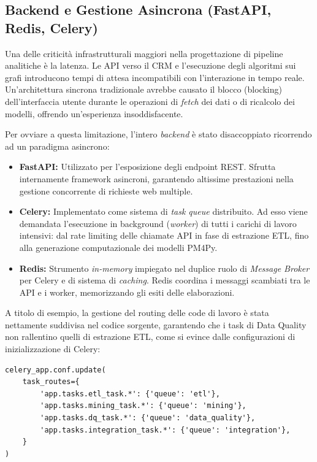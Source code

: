 \documentclass[12pt, a4paper]{report}
\begin{document}
\subsection{Backend e Gestione Asincrona (FastAPI, Redis, Celery)}
Una delle criticità infrastrutturali maggiori nella progettazione di pipeline analitiche è la latenza. Le API verso il CRM e l'esecuzione degli algoritmi sui grafi introducono tempi di attesa incompatibili con l'interazione in tempo reale. Un'architettura sincrona tradizionale avrebbe causato il blocco (blocking) dell'interfaccia utente durante le operazioni di \textit{fetch} dei dati o di ricalcolo dei modelli, offrendo un'esperienza insoddisfacente.

Per ovviare a questa limitazione, l'intero \textit{backend} è stato disaccoppiato ricorrendo ad un paradigma asincrono:
\begin{itemize}
    \item \textbf{FastAPI:} Utilizzato per l'esposizione degli endpoint REST. Sfrutta internamente framework asincroni, garantendo altissime prestazioni nella gestione concorrente di richieste web multiple.
    \item \textbf{Celery:} Implementato come sistema di \textit{task queue} distribuito. Ad esso viene demandata l'esecuzione in background (\textit{worker}) di tutti i carichi di lavoro intensivi: dal rate limiting delle chiamate API in fase di estrazione ETL, fino alla generazione computazionale dei modelli PM4Py.
    \item \textbf{Redis:} Strumento \textit{in-memory} impiegato nel duplice ruolo di \textit{Message Broker} per Celery e di sistema di \textit{caching}. Redis coordina i messaggi scambiati tra le API e i worker, memorizzando gli esiti delle elaborazioni.
\end{itemize}

A titolo di esempio, la gestione del routing delle code di lavoro è stata nettamente suddivisa nel codice sorgente, garantendo che i task di Data Quality non rallentino quelli di estrazione ETL, come si evince dalle configurazioni di inizializzazione di Celery:

\begin{verbatim}
celery_app.conf.update(
    task_routes={
        'app.tasks.etl_task.*': {'queue': 'etl'},
        'app.tasks.mining_task.*': {'queue': 'mining'},
        'app.tasks.dq_task.*': {'queue': 'data_quality'},
        'app.tasks.integration_task.*': {'queue': 'integration'},
    }
)
\end{verbatim}
\end{document}
